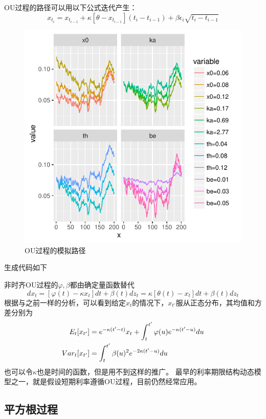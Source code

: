\documentclass[UTF8]{ctexart}
\begin{document}
OU过程的路径可以用以下公式迭代产生：
$$x_{t_i}=x_{t_{i-1}}+\kappa[\theta-x_{t_{i-1}}](t_i-t_{i-1})+\beta \epsilon_i \sqrt{t_i-t_{i-1}}$$

\begin{figure}[H]
\centering
\includegraphics{P54.pdf}

\caption*{OU过程的模拟路径\footnotemark}
\end{figure}
生成代码如下


非时齐OU过程的$\varphi,\beta$都由确定量函数替代
$$dx_t=[\varphi(t)-\kappa x_t]dt+\beta(t)dz_t=\kappa[\theta(t)-x_t]dt+\beta(t)dz_t$$
根据与之前一样的分析，可以看到给定$x_t$的情况下，$x_{t'}$服从正态分布，其均值和方差分别为
\begin{align}
E_t[x_{t'}] &= e^{-\kappa (t'-t)}x_t+\int_t^{t'}\varphi(u) e^{-\kappa (t'-u)} du \notag \\
Var_t[x_{t'}] &=\int_t^{t'}\beta(u)^2 e^{-2 \kappa(t'-u)}du \notag
\end{align}
也可以令$\kappa$也是时间的函数，但是用不到这样的推广。
最早的利率期限结构动态模型之一，就是假设短期利率遵循OU过程，目前仍然经常应用。

\subsection{平方根过程}
\end{document}
